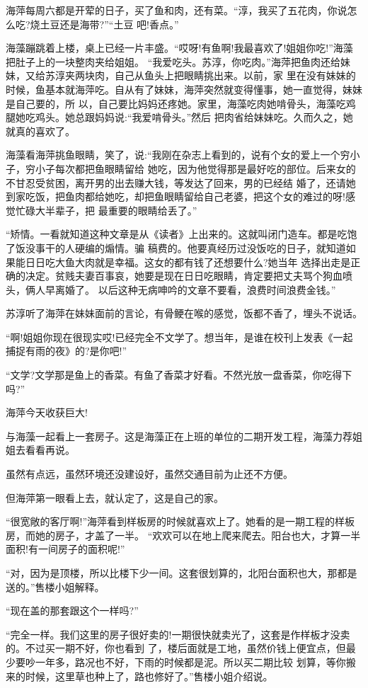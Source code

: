 \documentclass[11pt,a4paper,onecolumn]{article}
\begin{document}
海萍每周六都是开荤的日子，买了鱼和肉，还有菜。``淳，我买了五花肉，你说怎么吃?烧土豆还是海带?''``土豆
吧!香点。''

海藻蹦跳着上楼，桌上已经一片丰盛。``哎呀!有鱼啊!我最喜欢了!姐姐你吃!''海藻把肚子上的一块整肉夹给姐姐。
``我爱吃头。苏淳，你吃肉。''海萍把鱼肉还给妹妹，又给苏淳夹两块肉，自己从鱼头上把眼睛挑出来。以前，家
里在没有妹妹的时候，鱼基本就海萍吃。自从有了妹妹，海萍突然就变得懂事，她一直觉得，妹妹是自己要的，所
以，自己要比妈妈还疼她。家里，海藻吃肉她啃骨头，海藻吃鸡腿她吃鸡头。她总跟妈妈说:``我爱啃骨头。''然后
把肉省给妹妹吃。久而久之，她就真的喜欢了。

海藻看海萍挑鱼眼睛，笑了，说:``我刚在杂志上看到的，说有个女的爱上一个穷小子，穷小子每次都把鱼眼睛留给
她吃，因为他觉得那是最好吃的部位。后来女的不甘忍受贫困，离开男的出去赚大钱，等发达了回来，男的已经结
婚了，还请她到家吃饭，把鱼肉都给她吃，却把鱼眼睛留给自己老婆，把这个女的难过的呀!感觉忙碌大半辈子，把
最重要的眼睛给丢了。''

``矫情。一看就知道这种文章是从《读者》上出来的。这就叫闭门造车。都是吃饱了饭没事干的人硬编的煽情。骗
稿费的。他要真经历过没饭吃的日子，就知道如果能日日吃大鱼大肉就是幸福。这女的都有钱了还想要什么?她当年
选择出走是正确的决定。贫贱夫妻百事哀，她要是现在日日吃眼睛，肯定要把丈夫骂个狗血喷头，俩人早离婚了。
以后这种无病呻吟的文章不要看，浪费时间浪费金钱。''

苏淳听了海萍在妹妹面前的言论，有骨鲠在喉的感觉，饭都不香了，埋头不说话。

``啊!姐姐你现在很现实哎!已经完全不文学了。想当年，是谁在校刊上发表《一起捕捉有雨的夜》的?是你吧!''

``文学?文学那是鱼上的香菜。有鱼了香菜才好看。不然光放一盘香菜，你吃得下吗?''

海萍今天收获巨大!

与海藻一起看上一套房子。这是海藻正在上班的单位的二期开发工程，海藻力荐姐姐去看看再说。

虽然有点远，虽然环境还没建设好，虽然交通目前为止还不方便。

但海萍第一眼看上去，就认定了，这是自己的家。

``很宽敞的客厅啊!''海萍看到样板房的时候就喜欢上了。她看的是一期工程的样板房，而她的房子，才盖了一半。
``欢欢可以在地上爬来爬去。阳台也大，才算一半面积!有一间房子的面积呢!''

``对，因为是顶楼，所以比楼下少一间。这套很划算的，北阳台面积也大，那都是送的。''售楼小姐解释。

``现在盖的那套跟这个一样吗?''

``完全一样。我们这里的房子很好卖的!一期很快就卖光了，这套是作样板才没卖的。不过买一期不好，你也看到
了，楼后面就是工地，虽然价钱上便宜点，但最少要吵一年多，路况也不好，下雨的时候都是泥。所以买二期比较
划算，等你搬来的时候，这里草也种上了，路也修好了。''售楼小姐介绍说。
\end{document}

